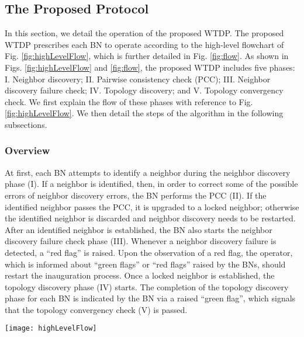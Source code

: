 \documentclass[10pt,english,two column]{IEEEtran}
\begin{document}
\subsection{The Proposed Protocol}

In this section, we detail the operation of the proposed WTDP. The
proposed WTDP prescribes each BN to operate according to the high-level
flowchart of Fig. \ref{fig:highLevelFlow}, which is further detailed
in Fig. \ref{fig:flow}. As shown in Figs. \ref{fig:highLevelFlow}
and \ref{fig:flow}, the proposed WTDP includes five phases: I. Neighbor
discovery; II. Pairwise consistency check (PCC); III. Neighbor discovery
failure check; IV. Topology discovery; and V. Topology convergency
check. We first explain the flow of these phases with reference to
Fig. \ref{fig:highLevelFlow}. We then detail the steps of the algorithm
in the following subsections. 


\subsubsection{Overview\label{sub:over}}

At first, each BN attempts to identify a neighbor during the neighbor
discovery phase (I). If a neighbor is identified, then, in order to
correct some of the possible errors of neighbor discovery errors,
the BN performs the PCC (II). If the identified neighbor passes the
PCC, it is upgraded to a locked neighbor; otherwise the identified
neighbor is discarded and neighbor discovery needs to be restarted.
After an identified neighbor is established, the BN also starts the
neighbor discovery failure check phase (III). Whenever a neighbor
discovery failure is detected, a ``red flag'' is raised. Upon the
observation of a red flag, the operator, which is informed about ``green
flags'' or ``red flags'' raised by the BNs, should restart the
inauguration process. Once a locked neighbor is established, the topology
discovery phase (IV) starts. The completion of the topology discovery
phase for each BN is indicated by the BN via a raised ``green flag'',
which signals that the topology convergency check (V) is passed.
\begin{figure*}[tbph]
\begin{centering}
\textsf{\texttt{[image: highLevelFlow]}}
\par\end{centering}

\caption{\label{fig:highLevelFlow}A high-level illustration of the operation
of a BN in the proposed WTDP. The circle indicates that a red flag
has been raised and that the BN is waiting for the inauguration process
to be restarted. }
\end{figure*}
\end{document}
